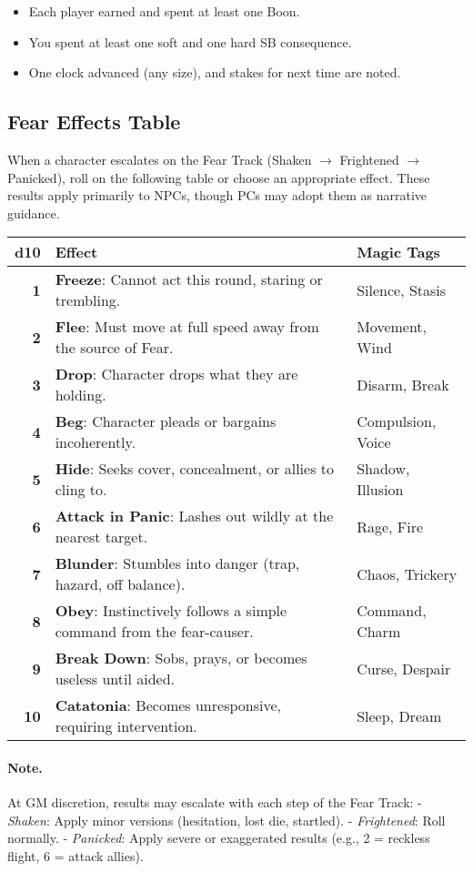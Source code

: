 \begin{tcolorbox}[title={Session 1 Done When},colback=gray!5,colframe=black]
\begin{itemize}
  \item Each player earned and spent at least one Boon.
  \item You spent at least one soft and one hard SB consequence.
  \item One clock advanced (any size), and stakes for next time are noted.
\end{itemize}
\end{tcolorbox}

\subsection{Fear Effects Table}
\label{subsec:fear-table}

When a character escalates on the Fear Track (Shaken $\rightarrow$ Frightened $\rightarrow$ Panicked), roll on the following table or choose an appropriate effect. These results apply primarily to NPCs, though PCs may adopt them as narrative guidance.

\begin{center}
\begin{tabular}{>{\bfseries}r l l}
\toprule
d10 & Effect & Magic Tags \\
\midrule
1 & \textbf{Freeze}: Cannot act this round, staring or trembling. & Silence, Stasis \\
2 & \textbf{Flee}: Must move at full speed away from the source of Fear. & Movement, Wind \\
3 & \textbf{Drop}: Character drops what they are holding. & Disarm, Break \\
4 & \textbf{Beg}: Character pleads or bargains incoherently. & Compulsion, Voice \\
5 & \textbf{Hide}: Seeks cover, concealment, or allies to cling to. & Shadow, Illusion \\
6 & \textbf{Attack in Panic}: Lashes out wildly at the nearest target. & Rage, Fire \\
7 & \textbf{Blunder}: Stumbles into danger (trap, hazard, off balance). & Chaos, Trickery \\
8 & \textbf{Obey}: Instinctively follows a simple command from the fear-causer. & Command, Charm \\
9 & \textbf{Break Down}: Sobs, prays, or becomes useless until aided. & Curse, Despair \\
10 & \textbf{Catatonia}: Becomes unresponsive, requiring intervention. & Sleep, Dream \\
\bottomrule
\end{tabular}
\end{center}

\paragraph{Note.}  
At GM discretion, results may escalate with each step of the Fear Track:  
- \emph{Shaken}: Apply minor versions (hesitation, lost die, startled).  
- \emph{Frightened}: Roll normally.  
- \emph{Panicked}: Apply severe or exaggerated results (e.g., 2 = reckless flight, 6 = attack allies).  
